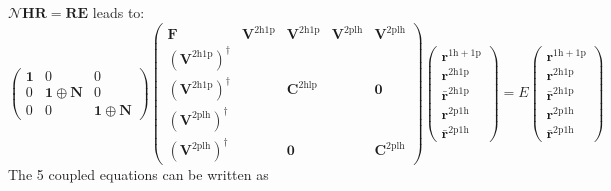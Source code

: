 $\bm{\mathcal{N}} \bm{H} \bm{R} = \bm{R} \bm{E}$ leads to:
\begin{equation}
\begin{pmatrix}
\bm{1} & 0 & 0 \\
0 & \bm{1} \oplus \bm{N} & 0 \\
0 & 0 & \bm{1} \oplus \bm{N}
\end{pmatrix}
\begin{pmatrix}
\bm{F} & \bm{V}^{2\mathrm{h1p}} & \bm{V}^{2\mathrm{h1p}} & \bm{V}^{2\mathrm{plh}} & \bm{V}^{2\mathrm{plh}} \\
\left(\bm{V}^{2\mathrm{h1p}}\right)^{\dagger} &  &  & & \\
\left(\bm{V}^{2\mathrm{h1p}}\right)^{\dagger} &  & \bm{C}^{2\mathrm{hlp}} & & \bm{0} \\
\left(\bm{V}^{2\mathrm{plh}}\right)^{\dagger} & & & & \\
\left(\bm{V}^{2\mathrm{plh}}\right)^{\dagger} &  & \bm{0} & & \bm{C}^{2\mathrm{plh}}
\end{pmatrix}
\begin{pmatrix}
\bm{r}^{1\mathrm{h}+1\mathrm{p}} \\
\bm{r}^{2\mathrm{h}1\mathrm{p}} \\
\bm{\bar{r}}^{2\mathrm{h}1\mathrm{p}} \\
\bm{r}^{2\mathrm{p}1\mathrm{h}} \\
\bm{\bar{r}}^{2\mathrm{p}1\mathrm{h}}
\end{pmatrix} = E
\begin{pmatrix}
\bm{r}^{1\mathrm{h}+1\mathrm{p}} \\
\bm{r}^{2\mathrm{h}1\mathrm{p}} \\
\bm{\bar{r}}^{2\mathrm{h}1\mathrm{p}} \\
\bm{r}^{2\mathrm{p}1\mathrm{h}} \\
\bm{\bar{r}}^{2\mathrm{p}1\mathrm{h}}
\end{pmatrix}
\end{equation}
The 5 coupled equations can be written as
